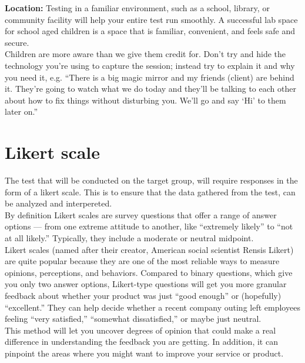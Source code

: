 \textbf{Location:} Testing in a familiar environment, such as a school, library, or community facility will help your entire test run smoothly. A successful lab space for school aged children is a space that is familiar, convenient, and feels safe and secure.\cite{testwithkids} \\

Children are more aware than we give them credit for. Don’t try and hide the technology you’re using to capture the session; instead try to explain it and why you need it, e.g.
“There is a big magic mirror and my friends (client) are behind it. They’re going to watch what we do today and they’ll be talking to each other about how to fix things without disturbing you. We’ll go and say ‘Hi’ to them later on.”\cite{testwithkids}\\

\section{Likert scale}

The test that will be conducted on the target group, will require responses in the form of a likert scale. This is to ensure that the data gathered from the test, can be analyzed and interpereted. \cite{likertScale} \\
By definition Likert scales are survey questions that offer a range of answer options — from one extreme attitude to another, like “extremely likely” to “not at all likely.” Typically, they include a moderate or neutral midpoint.\cite{likertScale} \\
Likert scales (named after their creator, American social scientist Rensis Likert) are quite popular because they are one of the most reliable ways to measure opinions, perceptions, and behaviors.
Compared to binary questions, which give you only two answer options, Likert-type questions will get you more granular feedback about whether your product was just “good enough” or (hopefully) “excellent.” They can help decide whether a recent company outing left employees feeling “very satisfied,” “somewhat dissatisfied,” or maybe just neutral.\cite{likertScale} \\
This method will let you uncover degrees of opinion that could make a real difference in understanding the feedback you are getting. In addition, it can pinpoint the areas where you might want to improve your service or product. \cite{likertScale} \\





